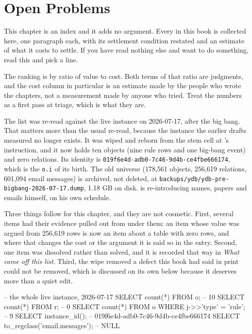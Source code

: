 \chapter{Open Problems}

This chapter is an index and it adds no argument. Every  in this book is collected here, one paragraph each, with its settlement condition restated and an estimate of what it costs to settle. If you have read nothing else and want to do something, read this and pick a line.

The ranking is by ratio of value to cost. Both terms of that ratio are judgments, and the cost column in particular is an estimate made by the people who wrote the chapters, not a measurement made by anyone who tried. Treat the numbers as a first pass at triage, which is what they are.

The list was re-read against the live instance on 2026-07-17, after the big bang. That matters more than the usual re-read, because the instance the earlier drafts measured no longer exists. It was wiped and reborn from the stem cell at \labPI's instruction, and it now holds ten objects (nine rule rows and one big-bang event) and zero relations. Its identity is \texttt{019f6e4d-adb0-7c46-9d4b-ce4fbe666174}, which is the \texttt{o.i} of its birth. The old universe (178,561 objects, 256,619 relations, 601,094 email messages) is archived, not deleted, at \texttt{backups/ydb/ydb-pre-bigbang-2026-07-17.dump}, 1.18 GB on disk. \labPI{} is re-introducing names, papers and emails himself, on his own schedule.

Three things follow for this chapter, and they are not cosmetic. First, several items had their evidence pulled out from under them: an item whose value was argued from 256,619 rows is now an item about a table with zero rows, and where that changes the cost or the argument it is said so in the entry. Second, one item was dissolved rather than solved, and it is recorded that way in \textit{What came off this list}. Third, the wipe removed a defect this book had said in print could not be removed, which is discussed on its own below because it deserves more than a quiet edit.

\begin{Check}
-- the whole live instance, 2026-07-17
SELECT count(*) FROM o;                                    -- 10
SELECT count(*) FROM r;                                    -- 0
SELECT count(*) FROM o WHERE j->>'type' = 'rule';          -- 9
SELECT instance_id();  -- 019f6e4d-adb0-7c46-9d4b-ce4fbe666174
SELECT to_regclass('email.messages');                      -- NULL
\end{Check}


